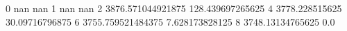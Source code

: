 0 nan nan
1 nan nan
2 3876.571044921875 128.439697265625
4 3778.228515625 30.09716796875
6 3755.759521484375 7.628173828125
8 3748.13134765625 0.0
